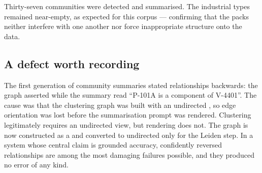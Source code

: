 \noindent Thirty-seven communities were detected and summarised. The industrial
types remained near-empty, as expected for this corpus --- confirming that the
packs neither interfere with one another nor force inappropriate structure onto
the data.

\subsection{A defect worth recording}

The first generation of community summaries stated relationships backwards:
the graph asserted  while the summary read
``P-101A is a component of V-4401''. The cause was that the clustering graph
was built with an undirected , so edge orientation was
lost before the summarisation prompt was rendered. Clustering legitimately
requires an undirected view, but rendering does not. The graph is now
constructed as a  and converted to undirected only for the Leiden
step. In a system whose central claim is grounded accuracy, confidently
reversed relationships are among the most damaging failures possible, and they
produced no error of any kind.
